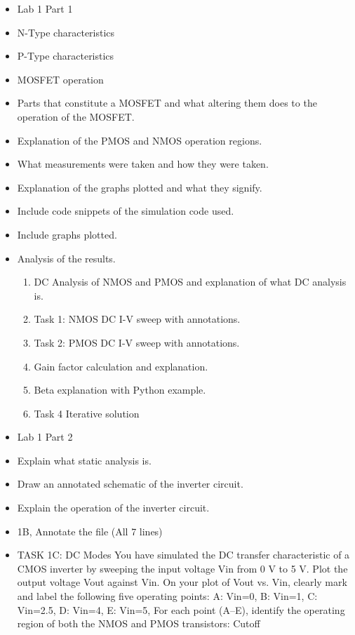 \documentclass[a4paper,12pt]{article}
\begin{document}
\begin{itemize}
    \item Lab 1 Part 1
    \item N-Type characteristics
    \item P-Type characteristics
    \item MOSFET operation
    \item Parts that constitute a MOSFET and what altering them does to the operation of the MOSFET.
    \item Explanation of the PMOS and NMOS operation regions.
    \item What measurements were taken and how they were taken.
    \item Explanation of the graphs plotted and what they signify.
    \item Include code snippets of the simulation code used.
    \item Include graphs plotted.
    \item Analysis of the results.
    \begin{enumerate}
        \item DC Analysis of NMOS and PMOS and explanation of what DC analysis is.
        \item Task 1: NMOS DC I-V sweep with annotations.
        \item Task 2: PMOS DC I-V sweep with annotations.
        \item Gain factor calculation and explanation.
        \item Beta explanation with Python example.
        \item Task 4 Iterative solution
    \end{enumerate}
    \item Lab 1 Part 2
    \item Explain what static analysis is.
    \item Draw an annotated schematic of the inverter circuit.
    \item Explain the operation of the inverter circuit.
    \item 1B, Annotate the file (All 7 lines)
    \item TASK 1C: DC Modes You have simulated the DC transfer characteristic of a CMOS inverter by sweeping the input voltage Vin from 0 V to 5 V. Plot the 
    output voltage Vout against Vin. On your plot of Vout vs. Vin, clearly mark and label the following five operating points:
    A: Vin=0, B: Vin=1, C: Vin=2.5, D: Vin=4, E: Vin=5, For each point (A–E), identify the operating region of both the NMOS and PMOS transistors: Cutoff

\end{itemize}
\end{document}
